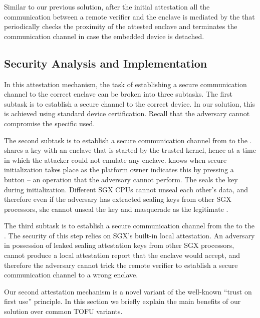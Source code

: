 \parasaver
{} 
Similar to our previous solution, after the initial attestation all the communication between a remote verifier and the enclave is mediated by the \device that periodically checks the proximity of the attested enclave and terminates the communication channel in case the embedded device is detached.


\subsection{Security Analysis and Implementation}
 
In this attestation mechanism, the task of establishing a secure communication channel to the correct enclave can be broken into three subtasks. The first subtask is to establish a secure channel to the correct \device device. In our solution, this is achieved using standard device certification. Recall that the adversary cannot compromise the specific \device used. 

The second subtask is to establish a secure communication channel from \device to the \nameclave. \device shares a key with an enclave that is started by the trusted \name kernel, hence at a time in which the attacker could not emulate any enclave. \device knows when secure initialization takes place as the platform owner indicates this by pressing a button -- an operation that the adversary cannot perform. The \nameclave seals the key during initialization. Different SGX CPUs cannot unseal each other's data, and therefore even if the adversary has extracted sealing keys from other SGX processors, she cannot unseal the key and masquerade as the legitimate \nameclave. 

The third subtask is to establish a secure communication channel from the \nameclave to the \app. The security of this step relies on SGX's built-in local attestation. An adversary in possession of leaked sealing attestation keys from other SGX processors, cannot produce a local attestation report that the \name enclave would accept, and therefore the adversary cannot trick the remote verifier to establish a secure communication channel to a wrong enclave.


\vspace{-2pt}
 Our second attestation mechanism is a novel variant of the well-known ``trust on first use'' principle. In this section we briefly explain the main benefits of our solution over common TOFU variants. 

